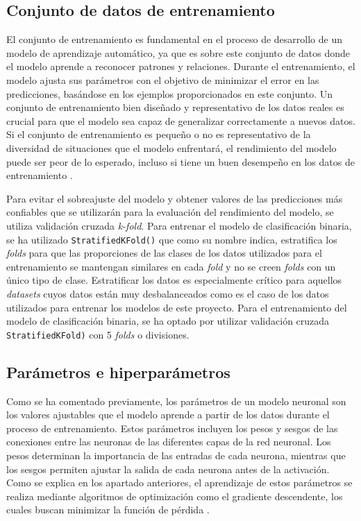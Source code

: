 \subsection{Conjunto de datos de entrenamiento} \label{subsec:conjdatent}
El conjunto de entrenamiento es fundamental en el proceso de desarrollo de un modelo de aprendizaje automático, ya que es sobre este conjunto de datos donde el modelo aprende a reconocer patrones y relaciones. Durante el entrenamiento, el modelo ajusta sus parámetros con el objetivo de minimizar el error en las predicciones, basándose en los ejemplos proporcionados en este conjunto. Un conjunto de entrenamiento bien diseñado y representativo de los datos reales es crucial para que el modelo sea capaz de generalizar correctamente a nuevos datos. Si el conjunto de entrenamiento es pequeño o no es representativo de la diversidad de situaciones que el modelo enfrentará, el rendimiento del modelo puede ser peor de lo esperado, incluso si tiene un buen desempeño en los datos de entrenamiento  \cite{bishop2006pattern}.

Para evitar el sobreajuste del modelo y obtener valores de las predicciones más confiables que se utilizarán para la evaluación del rendimiento del modelo, se utiliza validación cruzada \textit{k-fold}. Para entrenar el modelo de clasificación binaria, se ha utilizado \texttt{StratifiedKFold()} que como su nombre indica, estratifica los \textit{folds} para que las proporciones de las clases de los datos utilizados para el entrenamiento se mantengan similares en cada \textit{fold} y no se creen \textit{folds} con un único tipo de clase. Estratificar los datos es especialmente crítico para aquellos \textit{datasets} cuyos datos están muy desbalanceados como es el caso de los datos utilizados para entrenar los modelos de este proyecto. Para el entrenamiento del modelo de clasificación binaria, se ha optado por utilizar validación cruzada \texttt{StratifiedKFold)} con 5 \textit{folds} o divisiones.


\subsection{Parámetros e hiperparámetros}\label{sec:paramhiper}
Como se ha comentado previamente, los parámetros de un modelo neuronal son los valores ajustables que el modelo aprende a partir de los datos durante el proceso de entrenamiento. Estos parámetros incluyen los pesos y sesgos de las conexiones entre las neuronas de las diferentes capas de la red neuronal. Los pesos determinan la importancia de las entradas de cada neurona, mientras que los sesgos permiten ajustar la salida de cada neurona antes de la activación. Como se explica en los apartado anteriores, el aprendizaje de estos parámetros se realiza mediante algoritmos de optimización como el gradiente descendente, los cuales buscan minimizar la función de pérdida  \cite{goodfellow2016deep}.


